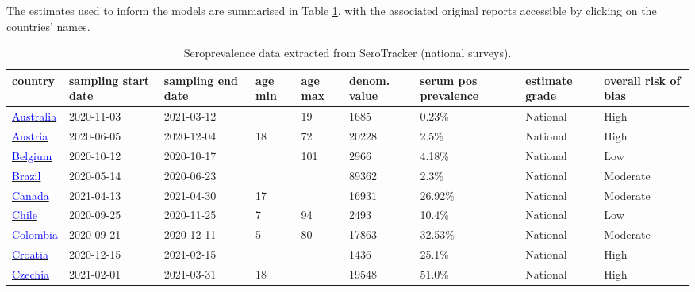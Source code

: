 The estimates used to inform the models are summarised in Table \ref{tab:sero_national}, with the associated original reports accessible by clicking on the countries' names.

\begin{table}[!ht]  
    \footnotesize
    \begin{center}
        \caption{Seroprevalence data extracted from SeroTracker (national surveys).}
        \label{tab:sero_national}
        \begin{tabular}{p{2cm} | p{1.6cm} | p{1.6cm} | p{0.8cm} | p{0.8cm} | p{1cm} | p{1.3cm} | p{1.2cm} | p{1.2cm}}
           \hline            
           \textbf{country} & \textbf{sampling start date} & \textbf{sampling end date} & \textbf{age min} & \textbf{age max} & \textbf{denom. value} & \textbf{serum pos prevalence} & \textbf{estimate grade} & \textbf{overall risk of bias} \\ 
\hline 
\href{https://dx.doi.org/10.5694/mja2.51542}{\textcolor{blue}{Australia}} & 2020-11-03 & 2021-03-12 &  & 19 & 1685 & 0.23\% & National & High \\ 
\hline 
\href{https://dx.doi.org/10.1007/s15010-021-01639-0}{\textcolor{blue}{Austria}} & 2020-06-05 & 2020-12-04 & 18 & 72 & 20228 & 2.5\% & National & High \\ 
\hline 
\href{https://dx.doi.org/10.2807/1560-7917.ES.2022.27.9.2100419}{\textcolor{blue}{Belgium}} & 2020-10-12 & 2020-10-17 &  & 101 & 2966 & 4.18\% & National & Low \\ 
\hline 
\href{https://www.ncbi.nlm.nih.gov/pmc/articles/PMC8225319/}{\textcolor{blue}{Brazil}} & 2020-05-14 & 2020-06-23 &  &  & 89362 & 2.3\% & National & Moderate \\ 
\hline 
\href{https://serotracker.com/en/Explore}{\textcolor{blue}{Canada}} & 2021-04-13 & 2021-04-30 & 17 &  & 16931 & 26.92\% & National & Moderate \\ 
\hline 
\href{https://dx.doi.org/10.1186/s12879-022-07045-7}{\textcolor{blue}{Chile}} & 2020-09-25 & 2020-11-25 & 7 & 94 & 2493 & 10.4\% & National & Low \\ 
\hline 
\href{https://dx.doi.org/10.1016/j.lana.2022.100195}{\textcolor{blue}{Colombia}} & 2020-09-21 & 2020-12-11 & 5 & 80 & 17863 & 32.53\% & National & Moderate \\ 
\hline 
\href{https://dx.doi.org/10.3390/pathogens10060774}{\textcolor{blue}{Croatia}} & 2020-12-15 & 2021-02-15 &  &  & 1436 & 25.1\% & National & High \\ 
\hline 
\href{https://doi.org/10.1038/s43856-022-00080-0}{\textcolor{blue}{Czechia}} & 2021-02-01 & 2021-03-31 & 18 &  & 19548 & 51.0\% & National & High \\ 

\end{tabular}
\end{center}
\end{table}
